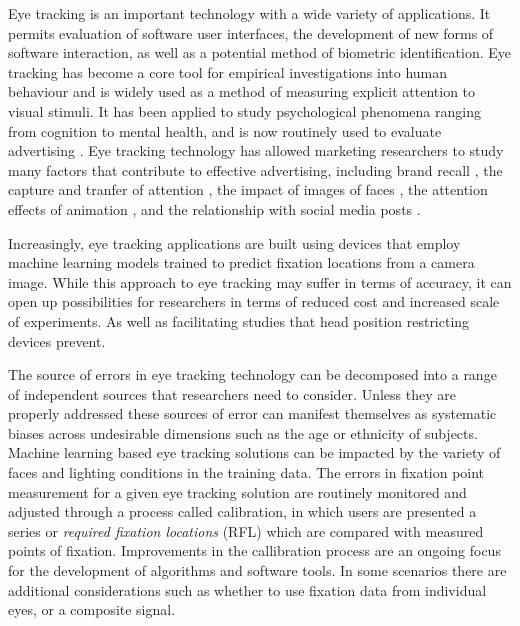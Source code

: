 \documentclass[12pt,a4paper]{article}
\numberwithin{equation}{section}
\begin{document}
Eye tracking is an important technology with a wide variety of applications. 
It permits evaluation of software user interfaces\cite{Harezlak2015}, 
the development of new forms of software interaction, as well as a potential method of biometric identification\cite{Kasprowski2018}. Eye tracking has become a core tool for empirical 
investigations into human behaviour and is widely used as a method of measuring explicit 
attention to visual stimuli. 
It has been applied to study psychological phenomena ranging from cognition\cite{Brunye2019}
to mental health\cite{Duque2014,Rudich-Strassler2022}, and is now routinely used to evaluate 
advertising \cite{Hervet2011}. Eye tracking technology has allowed marketing researchers 
to study many factors that contribute to effective advertising, 
including brand recall \cite{Wedel2000},
the capture and tranfer of attention \cite{Pieters2004}, 
the impact of images of faces \cite{Djamasbi2010},
the attention effects of animation \cite{Hamborg2012},
and the relationship with social media posts \cite{Barreto2013}.

Increasingly, eye tracking applications are built using devices that employ 
machine learning models trained to predict fixation locations from a camera image.
While this approach to eye tracking may suffer in terms of accuracy, it can
open up possibilities for researchers in terms of reduced cost and increased scale
of experiments. As well as facilitating studies that head position restricting 
devices prevent\cite{Valtakari2021}.

The source of errors in eye tracking technology can be decomposed into a range of
independent sources that researchers need to consider\cite{Holmqvist2012}.
Unless they are properly addressed these sources of error can manifest themselves
as systematic biases across undesirable dimensions such as the age\cite{Dalrymple2018}
or ethnicity of subjects\cite{Blignaut2013}. Machine learning based eye tracking solutions
can be impacted by the variety of faces and lighting conditions in the training data. 
The errors in fixation point measurement for a given eye tracking solution are routinely
monitored and adjusted through a process called calibration, in which users are presented
a series or \emph{required fixation locations} (RFL) which are compared with measured 
points of fixation\cite{Hornof2002}. 
Improvements in the callibration process
are an ongoing focus for the development of algorithms\cite{Zhang2014,Hassoumi2019} 
and software tools\cite{ETCAL2018}. In some scenarios there are additional considerations
such as whether to use fixation data from individual eyes, or a composite 
signal\cite{Hooge2019}.
\end{document}
